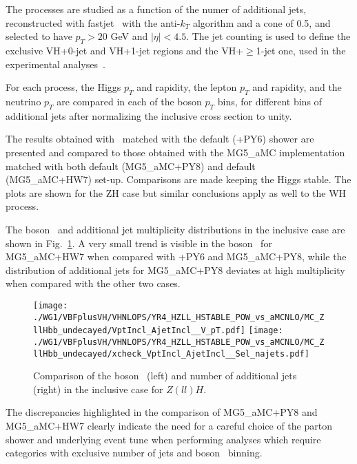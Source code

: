 The processes are studied as a function of the numer of additional jets,
reconstructed with fastjet~\cite{} with the anti-$k_T$ algorithm and a cone of 0.5, and selected to have $p_T > 20$ GeV and $|\eta| < 4.5$.
The jet counting is used to define the exclusive VH+0-jet and VH+1-jet regions and the VH+$\geq$1-jet one, 
used in the experimental analyses~\cite{Aad:2014xzb,Chatrchyan:2013zna}.

For each process, the Higgs $p_T$ and rapidity, the lepton $p_T$ and rapidity, and the neutrino $p_T$
are compared in each of the boson $p_T$ bins, for different bins of additional jets
after normalizing the inclusive cross section to unity.

The results obtained with \POWHEGBOX\ matched with the default  (\POWHEG{}+PY6) shower are presented and compared 
to those obtained with the {\sc MG5\_aMC} implementation matched with both default  ({\sc MG5\_aMC}+PY8) and default ~\cite{Bellm:2015jjp,Bahr:2008pv} ({\sc MG5\_aMC}+HW7) set-up. 
%
Comparisons are made keeping the Higgs stable.
The plots are shown for the ZH case but similar conclusions apply as well to the WH process.
%
%

The boson \pt\ and additional jet multiplicity distributions in the inclusive case are shown in Fig.~\ref{fig:stable__incl_vpt_jets}.
A very small trend is visible in the boson \pt\ for {\sc MG5\_aMC}+HW7 when compared with \POWHEG{}+PY6 and {\sc MG5\_aMC}+PY8,
while the distribution of additional jets for {\sc MG5\_aMC}+PY8 deviates at high multiplicity when compared with the other two cases.
\begin{figure}[hptb]
\centering
\texttt{[image: ./WG1/VBFplusVH/VHNLOPS/YR4\_HZLL\_HSTABLE\_POW\_vs\_aMCNLO/MC\_ZllHbb\_undecayed/VptIncl\_AjetIncl\_\_V\_pT.pdf]}
\texttt{[image: ./WG1/VBFplusVH/VHNLOPS/YR4\_HZLL\_HSTABLE\_POW\_vs\_aMCNLO/MC\_ZllHbb\_undecayed/xcheck\_VptIncl\_AjetIncl\_\_Sel\_najets.pdf]}
\caption{Comparison of the boson \pt\ (left) and number of additional jets (right) in the inclusive case for $Z(ll)H$.}
\label{fig:stable__incl_vpt_jets}
\end{figure}
%
The discrepancies highlighted in the comparison of {\sc MG5\_aMC}+PY8 and {\sc MG5\_aMC}+HW7 clearly indicate the need 
for a careful choice of the parton shower and underlying event tune when performing analyses 
which require categories with exclusive number of jets and boson \pt\ binning.

